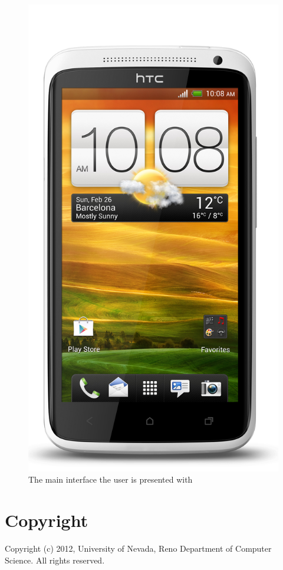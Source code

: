\documentclass{chi-ext}
\begin{document}
\pagebreak

\begin{figure}
\parbox{1\columnwidth}{

  \centering
  \includegraphics[width=0.8\columnwidth]{onex.jpg}
  \caption{The main interface the user is presented with}
  \label{fig:maininterface}
}
\end{figure}

\pagebreak

\section{Copyright}
Copyright (c) 2012, University of Nevada, Reno Department of Computer Science.
All rights reserved.
\end{document}
